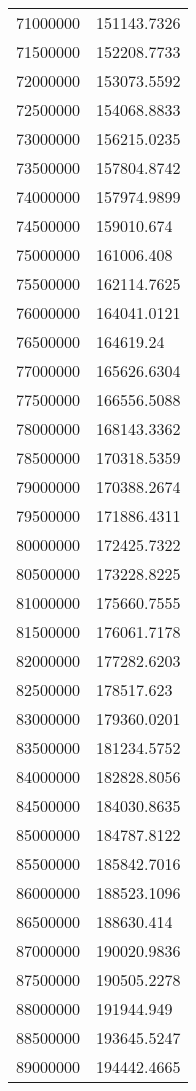 \documentclass{article}
\begin{document}
\begin{longtable}[c]{ll}
71000000       & 151143.7326 \\
71500000       & 152208.7733 \\
72000000       & 153073.5592 \\
72500000       & 154068.8833 \\
73000000       & 156215.0235 \\
73500000       & 157804.8742 \\
74000000       & 157974.9899 \\
74500000       & 159010.674  \\
75000000       & 161006.408  \\
75500000       & 162114.7625 \\
76000000       & 164041.0121 \\
76500000       & 164619.24   \\
77000000       & 165626.6304 \\
77500000       & 166556.5088 \\
78000000       & 168143.3362 \\
78500000       & 170318.5359 \\
79000000       & 170388.2674 \\
79500000       & 171886.4311 \\
80000000       & 172425.7322 \\
80500000       & 173228.8225 \\
81000000       & 175660.7555 \\
81500000       & 176061.7178 \\
82000000       & 177282.6203 \\
82500000       & 178517.623  \\
83000000       & 179360.0201 \\
83500000       & 181234.5752 \\
84000000       & 182828.8056 \\
84500000       & 184030.8635 \\
85000000       & 184787.8122 \\
85500000       & 185842.7016 \\
86000000       & 188523.1096 \\
86500000       & 188630.414  \\
87000000       & 190020.9836 \\
87500000       & 190505.2278 \\
88000000       & 191944.949  \\
88500000       & 193645.5247 \\
89000000       & 194442.4665 \\

\end{longtable}
\end{document}
